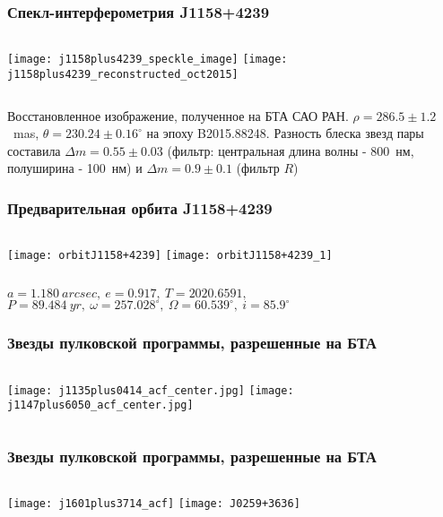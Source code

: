 \begin{frame}
\frametitle{Спекл-интерферометрия J1158+4239}
\begin{center}
\begin{columns}
	\texttt{[image: j1158plus4239\_speckle\_image]}
	\texttt{[image: j1158plus4239\_reconstructed\_oct2015]}
\end{columns}
\end{center}
{\footnotesize
	Восстановленное изображение, полученное на БТА САО РАН. $\rho = 286.5\pm1.2$~mas, $\theta=230.24  \pm 0.16^{\circ}$ на эпоху B2015.88248. Разность блеска звезд пары составила $\Delta m = 0.55\pm 0.03$ (фильтр: центральная длина волны - 800~нм, полуширина - 100~нм) и $\Delta m = 0.9\pm 0.1$ (фильтр $R$)
}
\end{frame}


\begin{frame}%
\frametitle{Предварительная орбита J1158+4239}
\begin{columns}
\texttt{[image: orbitJ1158+4239]}
	\texttt{[image: orbitJ1158+4239\_1]}
\end{columns}
{\footnotesize
	$a = 1.180~arcsec,~e=0.917,~T=2020.6591,$ $P=89.484~yr,~\omega=257.028^{\circ},~\Omega=60.539^{\circ},~i=85.9^{\circ}$
}
\end{frame}

\begin{frame}%
\frametitle{Звезды пулковской программы, разрешенные на БТА}
\begin{columns}
\texttt{[image: j1135plus0414\_acf\_center.jpg]}
	\texttt{[image: j1147plus6050\_acf\_center.jpg]}
\end{columns}
\end{frame}

\begin{frame}%
\frametitle{Звезды пулковской программы, разрешенные на БТА}
\begin{columns}
\texttt{[image: j1601plus3714\_acf]}
	\texttt{[image: J0259+3636]}
\end{columns}
\end{frame}

